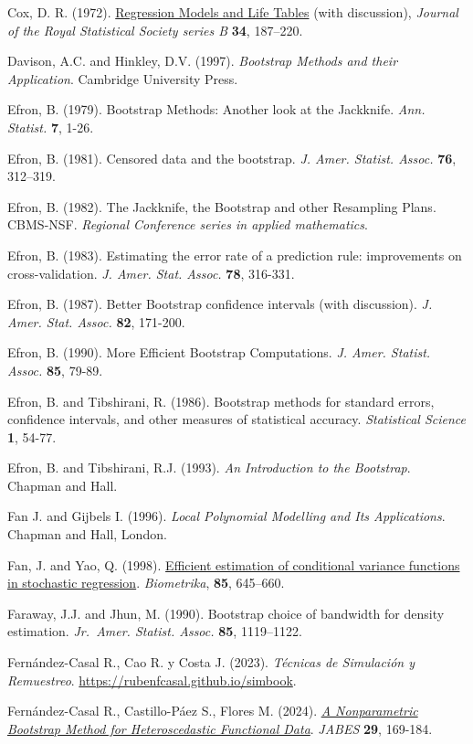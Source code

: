 \documentclass[
]{book}
\theoremstyle{break}
\theoremstyle{nonumberplain}
\begin{document}
Cox, D. R. (1972). \href{https://rss.onlinelibrary.wiley.com/doi/abs/10.1111/j.2517-6161.1972.tb00899.x}{Regression Models and Life Tables}
(with discussion), \emph{Journal of the Royal Statistical Society series B} \textbf{34}, 187--220.

Davison, A.C. and Hinkley, D.V. (1997).
\emph{Bootstrap Methods and their Application}. Cambridge University Press.

Efron, B. (1979). Bootstrap Methods: Another look at the Jackknife.
\emph{Ann. Statist.} \textbf{7}, 1-26.

Efron, B. (1981). Censored data and the bootstrap.
\emph{J. Amer. Statist. Assoc.} \textbf{76}, 312--319.

Efron, B. (1982). The Jackknife, the Bootstrap and other Resampling
Plans. CBMS-NSF. \emph{Regional Conference series in applied mathematics}.

Efron, B. (1983). Estimating the error rate of a prediction rule:
improvements on cross-validation. \emph{J. Amer. Stat. Assoc.} \textbf{78}, 316-331.

Efron, B. (1987). Better Bootstrap confidence intervals (with
discussion). \emph{J. Amer. Stat. Assoc.} \textbf{82}, 171-200.

Efron, B. (1990). More Efficient Bootstrap Computations.
\emph{J. Amer. Statist. Assoc.} \textbf{85}, 79-89.

Efron, B. and Tibshirani, R. (1986). Bootstrap methods for standard
errors, confidence intervals, and other measures of statistical
accuracy. \emph{Statistical Science} \textbf{1}, 54-77.

Efron, B. and Tibshirani, R.J. (1993). \emph{An Introduction to the Bootstrap}.
Chapman and Hall.

Fan J. and Gijbels I. (1996). \emph{Local Polynomial Modelling and Its Applications}.
Chapman and Hall, London.

Fan, J. and Yao, Q. (1998). \href{https://doi.org/10.1093/biomet/85.3.645}{Efficient estimation of conditional variance functions
in stochastic regression}.
\emph{Biometrika}, \textbf{85}, 645--660.

Faraway, J.J. and Jhun, M. (1990). Bootstrap choice of bandwidth for
density estimation. \emph{Jr.~Amer. Statist. Assoc.} \textbf{85}, 1119--1122.

Fernández-Casal R., Cao R. y Costa J. (2023). \emph{Técnicas de Simulación y Remuestreo}. \url{https://rubenfcasal.github.io/simbook}.

Fernández-Casal R., Castillo-Páez S., Flores M. (2024). \href{https://doi.org/10.1007/s13253-023-00561-2}{\emph{A Nonparametric Bootstrap Method for Heteroscedastic Functional Data}}. \emph{JABES} \textbf{29}, 169-184.
\end{document}
